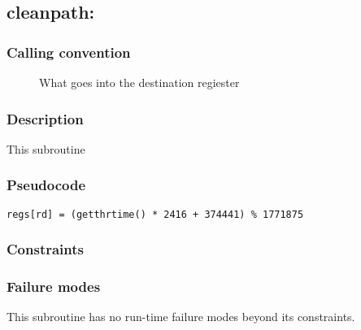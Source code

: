 \clearpage
{}
{}
\label{subr:cleanpath}
\subsection*{cleanpath: }

\subsubsection*{Calling convention}

\begin{description}
\item[] What goes into the destination regiester
\end{description}

\subsubsection*{Description}

This subroutine 
\subsubsection*{Pseudocode}

\begin{verbatim}
regs[rd] = (getthrtime() * 2416 + 374441) % 1771875
\end{verbatim}

\subsubsection*{Constraints}

\subsubsection*{Failure modes}

This subroutine has no run-time failure modes beyond its constraints.
